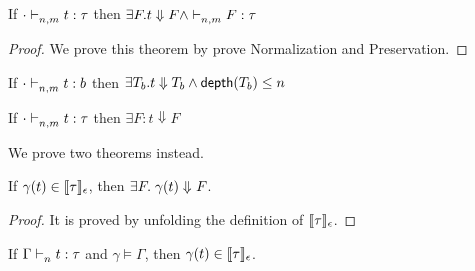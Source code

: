 \documentclass{article}
\begin{document}
\clearpage
\begin{theorem}
	If $\cdot \mathrel{\vdash_{n,m}^{} {t} : {\tau}} $ then $ \exists F. t \Downarrow F \land \mathrel{\vdash_{n,m}^{} {F} : {\tau}}$
\end{theorem}
  \begin{proof}
   We prove this theorem by prove Normalization and Preservation.
  \end{proof}

\begin{corollary}
\label{corollary}
	If $ \cdot\mathrel{\vdash_{n,m}^{} {t} : {b}} $ then $ \exists T_b. t \Downarrow T_b \land \mathsf{depth}(T_b) \leq n$
\end{corollary}
  

\clearpage

\begin{theorem}[Normalization] 
	If $\cdot\mathrel{\vdash_{n,m}^{} {t} : {\tau}} $ then $ \exists F: t \Downarrow F$
\end{theorem}
We prove two theorems instead.

\begin{theorem}
If $\gamma(t) \in \llbracket {\tau} \rrbracket_{\epsilon} $, then $\exists F.\mathrel{ { \gamma(t)  } \Downarrow^{} { F} }$.
\end{theorem}
\begin{proof}
  It is proved by unfolding the definition of $\llbracket {\tau} \rrbracket_{\epsilon}$.
\end{proof}
 
\begin{theorem}
 If $\Gamma \mathrel{\vdash_{n}^{} {t} : {\tau}}$ and $\gamma \vDash{\Gamma}$, then $\gamma(t) \in \llbracket {\tau} \rrbracket_{\epsilon} $.
\end{theorem} 
\end{document}
